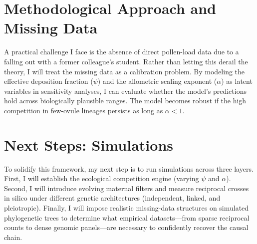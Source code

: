 \documentclass[12pt]{article}
\begin{document}
\section*{Methodological Approach and Missing Data}
A practical challenge I face is the absence of direct pollen-load data due to a falling out with a former colleague's student. Rather than letting this derail the theory, I will treat the missing data as a calibration problem. By modeling the effective deposition fraction ($\psi$) and the allometric scaling exponent ($\alpha$) as latent variables in sensitivity analyses, I can evaluate whether the model's predictions hold across biologically plausible ranges. The model becomes robust if the high competition in few-ovule lineages persists as long as $\alpha < 1$.

\section*{Next Steps: Simulations}
To solidify this framework, my next step is to run simulations across three layers. First, I will establish the ecological competition engine (varying $\psi$ and $\alpha$). Second, I will introduce evolving maternal filters and measure reciprocal crosses in silico under different genetic architectures (independent, linked, and pleiotropic). Finally, I will impose realistic missing-data structures on simulated phylogenetic trees to determine what empirical datasets---from sparse reciprocal counts to dense genomic panels---are necessary to confidently recover the causal chain.
\end{document}
